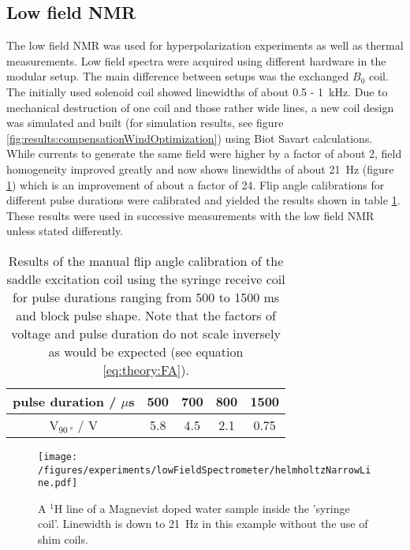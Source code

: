     \subsection{Low field NMR}
    \label{chap:results:lowFieldNMR}
    The low field NMR was used for hyperpolarization experiments as well as thermal measurements. Low field spectra were acquired using different hardware in the modular setup. The main difference between setups was the exchanged $B_0$ coil. The initially used solenoid coil showed linewidths of about 0.5 - \SI{1}{\kilo\hertz}. Due to mechanical destruction of one coil and those rather wide lines, a new coil design was simulated and built (for simulation results, see figure \ref{fig:results:compensationWindOptimization}) using Biot Savart calculations. While currents to generate the same field were higher by a factor of about 2, field homogeneity improved greatly and now shows linewidths of about \SI{21}{\hertz} (figure \ref{results:lowFieldSpectrometer:thinLine}) which is an improvement of about a factor of 24. Flip angle calibrations for different pulse durations were calibrated and yielded the results shown in table \ref{table:results:FA}. These results were used in successive measurements with the low field NMR unless stated differently.
        \begin{table}
            \centering
            \begin{tabular}{|c|cccc|}
            \hline
            pulse duration / $\mu$s & 500 & 700 &  800 & 1500 \\
            \hline
            $\mathrm{V}_{\SI{90}{\degree}}$ / V & 5.8 & 4.5 &  2.1&  0.75 \\
            \hline
            \end{tabular} 
            \caption[Flip angle calibration results]{Results of the manual flip angle calibration of the saddle excitation coil using the syringe receive coil for pulse durations ranging from 500 to 1500 ms and block pulse shape. Note that the factors of voltage and pulse duration do not scale inversely as would be expected (see equation \ref{eq:theory:FA}).}
            \label{table:results:FA}
        \end{table}
            \begin{figure}
                \centering
                \texttt{[image: /figures/experiments/lowFieldSpectrometer/helmholtzNarrowLine.pdf]}
                \caption[Thin line helmholtz coils]{A $^1\mathrm{H}$ line of a Magnevist doped water sample inside the 'syringe coil'. Linewidth is down to \SI{21}{\hertz} in this example without the use of shim coils.}
                \label{results:lowFieldSpectrometer:thinLine}
            \end{figure}
